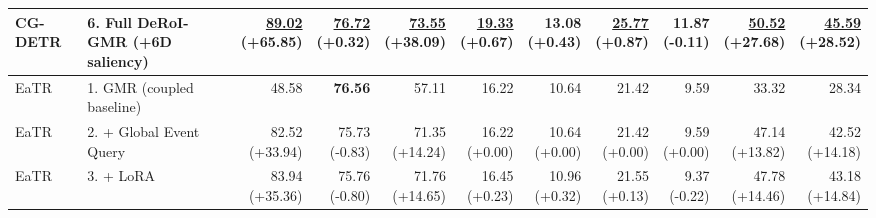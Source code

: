\documentclass{article}
\begin{document}
{\begin{tabular}{llrrrrrrrrr}
CG-DETR & 6. Full DeRoI-GMR (+6D saliency) & \shortstack{\underline{89.02} \\ {\scriptsize (+65.85)}} & \shortstack{\underline{76.72} \\ {\scriptsize (+0.32)}} & \shortstack{\underline{73.55} \\ {\scriptsize (+38.09)}} & \shortstack{\underline{19.33} \\ {\scriptsize (+0.67)}} & \shortstack{13.08 \\ {\scriptsize (+0.43)}} & \shortstack{\underline{25.77} \\ {\scriptsize (+0.87)}} & \shortstack{11.87 \\ {\scriptsize (-0.11)}} & \shortstack{\underline{50.52} \\ {\scriptsize (+27.68)}} & \shortstack{\underline{45.59} \\ {\scriptsize (+28.52)}} \\
\midrule
EaTR & 1. GMR (coupled baseline) & 48.58 & \textbf{76.56} & 57.11 & 16.22 & 10.64 & 21.42 & 9.59 & 33.32 & 28.34 \\
EaTR & 2. + Global Event Query & \shortstack{82.52 \\ {\scriptsize (+33.94)}} & \shortstack{75.73 \\ {\scriptsize (-0.83)}} & \shortstack{71.35 \\ {\scriptsize (+14.24)}} & \shortstack{16.22 \\ {\scriptsize (+0.00)}} & \shortstack{10.64 \\ {\scriptsize (+0.00)}} & \shortstack{21.42 \\ {\scriptsize (+0.00)}} & \shortstack{9.59 \\ {\scriptsize (+0.00)}} & \shortstack{47.14 \\ {\scriptsize (+13.82)}} & \shortstack{42.52 \\ {\scriptsize (+14.18)}} \\
EaTR & 3. + LoRA & \shortstack{83.94 \\ {\scriptsize (+35.36)}} & \shortstack{75.76 \\ {\scriptsize (-0.80)}} & \shortstack{71.76 \\ {\scriptsize (+14.65)}} & \shortstack{16.45 \\ {\scriptsize (+0.23)}} & \shortstack{10.96 \\ {\scriptsize (+0.32)}} & \shortstack{21.55 \\ {\scriptsize (+0.13)}} & \shortstack{9.37 \\ {\scriptsize (-0.22)}} & \shortstack{47.78 \\ {\scriptsize (+14.46)}} & \shortstack{43.18 \\ {\scriptsize (+14.84)}} \\

\end{tabular}}
\end{document}
